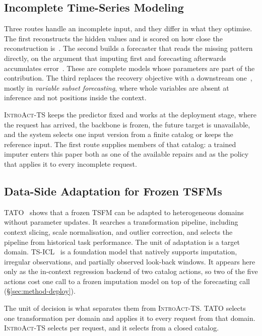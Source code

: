 \documentclass{article}
\newcommand{\introact}{\textsc{IntroAct-TS}}
\newcommand{\tsfm}{TSFM}
\begin{document}
\subsection{Incomplete Time-Series Modeling}
\label{sec:related-incomplete}
Three routes handle an incomplete input, and they differ in what they optimise. The first
reconstructs the hidden values and is scored on how close the reconstruction
is~\citep{cao2018brits,tashiro2021csdi,yoon2018gain,du2023saits,park2026t1}. The second builds
a forecaster that reads the missing pattern directly, on the argument that imputing first and
forecasting afterwards accumulates error~\citep{chen2024bitgraph,peng2025s4m,
jang2026channeltokenformer}. These are complete models whose parameters are part of the
contribution. The third replaces the recovery objective with a downstream
one~\citep{wang2024taskoriented,hao2025toivsf,hao2025gimcc,liang2025vida,xu2026srdi}, mostly in
\emph{variable subset forecasting}, where whole variables are absent at inference and not
positions inside the context.

\introact{} keeps the predictor fixed and works at the deployment stage, where the request has
arrived, the backbone is frozen, the future target is unavailable, and the system selects one
input version from a finite catalog or keeps the reference input. The first route supplies
members of that catalog: a trained imputer enters this paper both as one of the available
repairs and as the policy that applies it to every incomplete request.

\subsection{Data-Side Adaptation for Frozen \tsfm{}s}
\label{sec:related-dataside}
TATO~\citep{qiu2026tato} shows that a frozen \tsfm{} can be adapted to heterogeneous domains
without parameter updates. It searches a transformation pipeline, including context slicing,
scale normalisation, and outlier correction, and selects the pipeline from historical task
performance. The unit of adaptation is a target domain. TS-ICL~\citep{tsicl2026} is a
foundation model that natively supports imputation, irregular observations, and partially
observed look-back windows. It appears here only as the in-context regression backend of two
catalog actions, so two of the five actions cost one call to a frozen imputation model on top
of the forecasting call (\S\ref{sec:method-deploy}).

The unit of decision is what separates them from \introact{}. TATO selects one transformation
per domain and applies it to every request from that domain. \introact{} selects per request,
and it selects from a closed catalog.
\end{document}
